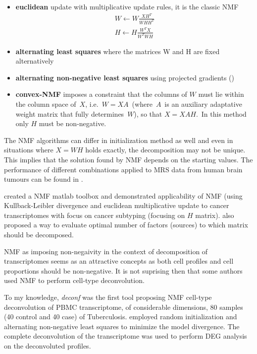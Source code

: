 \documentclass[12pt,]{book}
\providecommand{\tightlist}{%
  \setlength{\itemsep}{0pt}\setlength{\parskip}{0pt}}
\theoremstyle{definition}
\theoremstyle{definition}
\theoremstyle{definition}
\theoremstyle{remark}
\begin{document}
\begin{itemize}
\tightlist
\item
  \textbf{euclidean} update with multiplicative update rules, it is the
  classic NMF \citep{Seung1999} \begin{equation}
  \begin{aligned}
  W \leftarrow W \frac{XH^T}{WHH^T}\\H \leftarrow H\frac{W^TX}{W^TWH}  \label{eq:euclidNMF} 
  \end{aligned}
  \end{equation}
\item
  \textbf{alternating least squares} \citep{Paatero1994} where the
  matrices W and H are fixed alternatively
\item
  \textbf{alternating non-negative least squares} using projected
  gradients (\citet{Lin2007})
\item
  \textbf{convex-NMF }\citep{Ding2010} imposes a constraint that the
  columns of \(W\) must lie within the column space of~\(X\),
  i.e.~\(W = XA\)~(where~\(A\)~is an auxiliary adaptative weight matrix
  that fully determines~\(W\)), so that \(X=XAH\).~In this method only
  \(H\) must be non-negative.
\end{itemize}

The NMF algorithms can differ in initialization method as well and even
in situations where \(X = WH\) holds exactly, the decomposition may not
be unique. This implies that the solution found by NMF depends on the
starting values. The performance of different combinations applied to
MRS data from human brain tumours can be found in
\citet{OrtegaMartorell2012}.

\citet{Brunet2004} created a NMF matlab toolbox and demonstrated
applicability of NMF (using Kullback-Leibler divergence and euclidean
multiplicative update \citep{Lee2000} to cancer transcriptomes with
focus on cancer subtyping (focusing on \(H\) matrix). \citet{Brunet2004}
also proposed a way to evaluate optimal number of factors (sources) to
which matrix should be decomposed.

NMF as imposing non-negaivity in the context of decomposition of
transcriptomes seems as an attractive concepts as both cell profiles and
cell proportions should be non-negative. It is not suprising then that
some authors used NMF to perform cell-type deconvolution.

To my knowledge, \emph{deconf} \citep{Repsilber2010} was the first tool
proposing NMF cell-type deconvolution of PBMC transcriptome, of
considerable dimensions, 80 samples (40 control and 40 case) of
Tuberculosis. \citet{Repsilber2010} employed random initialization and
alternating non-negative least squares to minimize the model divergence.
The complete deconvolution of the transcriptome was used to perform DEG
analysis on the deconvoluted profiles.
\end{document}
